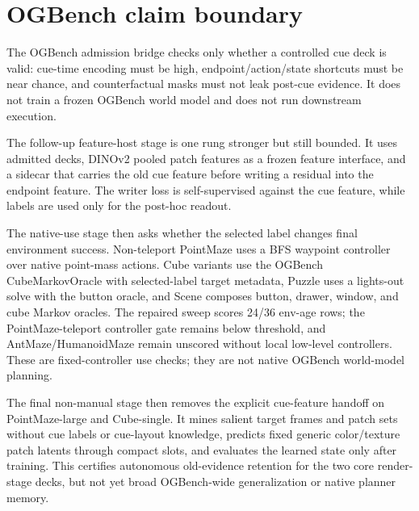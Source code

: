 \section{OGBench claim boundary}

The OGBench admission bridge checks only whether a controlled cue deck is
valid: cue-time encoding must be high, endpoint/action/state shortcuts must be
near chance, and counterfactual masks must not leak post-cue evidence.  It
does not train a frozen OGBench world model and does not run downstream
execution.

The follow-up feature-host stage is one rung stronger but still bounded.  It
uses admitted decks, DINOv2 pooled patch features as a frozen feature
interface, and a sidecar that carries the old cue feature before writing a
residual into the endpoint feature.  The writer loss is self-supervised against
the cue feature, while labels are used only for the post-hoc readout.

The native-use stage then asks whether the selected label changes final
environment success.  Non-teleport PointMaze uses a BFS waypoint controller
over native point-mass actions.  Cube variants use the OGBench
CubeMarkovOracle with selected-label target metadata, Puzzle uses a lights-out
solve with the button oracle, and Scene composes button, drawer, window, and
cube Markov oracles.  The repaired sweep scores 24/36 env-age rows; the
PointMaze-teleport controller gate remains below threshold, and
AntMaze/HumanoidMaze remain unscored without local low-level controllers.
These are fixed-controller use checks; they are not native OGBench world-model
planning.

The final non-manual stage then removes the explicit cue-feature handoff on
PointMaze-large and Cube-single.  It mines salient target frames and patch
sets without cue labels or cue-layout knowledge, predicts fixed generic
color/texture patch latents through compact slots, and evaluates the learned
state only after training.  This certifies autonomous old-evidence retention
for the two core render-stage decks, but not yet broad OGBench-wide
generalization or native planner memory.

